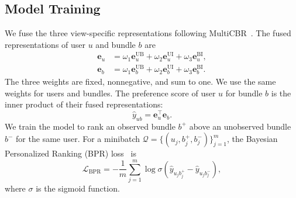 \documentclass[letterpaper,journal]{IEEEtran}
\begin{document}
\subsection{Model Training}

We fuse the three view-specific representations following MultiCBR~\cite{ma2024multicbr}. The fused representations of user $u$ and bundle $b$ are
\begin{equation}
\begin{aligned}
\mathbf e_u
&=\omega_1\mathbf e_u^{\mathrm{UB}}
+\omega_2\mathbf e_u^{\mathrm{UI}}
+\omega_3\mathbf e_u^{\mathrm{BI}},\\
\mathbf e_b
&=\omega_1\mathbf e_b^{\mathrm{UB}}
+\omega_2\mathbf e_b^{\mathrm{UI}}
+\omega_3\mathbf e_b^{\mathrm{BI}}.
\end{aligned}
\tag{17}
\end{equation}
The three weights are fixed, nonnegative, and sum to one. We use the same weights for users and bundles. The preference score of user $u$ for bundle $b$ is the inner product of their fused representations:
\begin{equation}
\hat y_{ub}=\mathbf e_u^\top\mathbf e_b.
\tag{18}
\end{equation}
We train the model to rank an observed bundle $b^+$ above an unobserved bundle $b^-$ for the same user. For a minibatch $\mathcal Q=\{(u_j,b_j^+,b_j^-)\}_{j=1}^{m}$, the Bayesian Personalized Ranking (BPR) loss~\cite{rendle2009bpr} is
\begin{equation}
\mathcal L_{\mathrm{BPR}}
=-\frac{1}{m}
\sum_{j=1}^{m}
\log\sigma\!\left(\hat y_{u_jb_j^+}-\hat y_{u_jb_j^-}\right),
\tag{19}
\end{equation}
where $\sigma$ is the sigmoid function.
\end{document}
